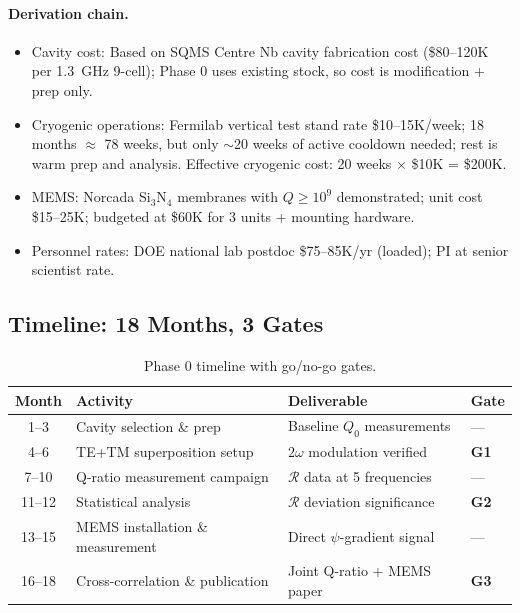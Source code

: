 \documentclass[11pt]{article}
\begin{document}
\paragraph{Derivation chain.}
\begin{itemize}
\item Cavity cost: Based on SQMS Centre Nb cavity fabrication cost
  (\$80--120K per 1.3~GHz 9-cell); Phase 0 uses existing stock,
  so cost is modification + prep only.
\item Cryogenic operations: Fermilab vertical test stand rate
  \$10--15K/week; 18 months $\approx$ 78 weeks, but only $\sim$20
  weeks of active cooldown needed; rest is warm prep and analysis.
  Effective cryogenic cost: 20 weeks $\times$ \$10K = \$200K.
\item MEMS: Norcada Si$_3$N$_4$ membranes with $Q \geq 10^9$
  demonstrated; unit cost \$15--25K; budgeted at \$60K for
  3 units + mounting hardware.
\item Personnel rates: DOE national lab postdoc \$75--85K/yr
  (loaded); PI at senior scientist rate.
\end{itemize}

\subsection{Timeline: 18 Months, 3 Gates}\label{sec:timeline}

\begin{table}[h]
\centering
\caption{Phase 0 timeline with go/no-go gates.}
\label{tab:timeline}
\begin{tabular}{@{}clll@{}}
\toprule
\textbf{Month} & \textbf{Activity} & \textbf{Deliverable} & \textbf{Gate} \\
\midrule
1--3 & Cavity selection \& prep & Baseline $Q_0$ measurements & --- \\
4--6 & TE+TM superposition setup & $2\omega$ modulation verified & \textbf{G1} \\
7--10 & Q-ratio measurement campaign & $\mathcal{R}$ data at 5 frequencies & --- \\
11--12 & Statistical analysis & $\mathcal{R}$ deviation significance & \textbf{G2} \\
13--15 & MEMS installation \& measurement & Direct $\psi$-gradient signal & --- \\
16--18 & Cross-correlation \& publication & Joint Q-ratio + MEMS paper & \textbf{G3} \\
\bottomrule
\end{tabular}
\end{table}
\end{document}
